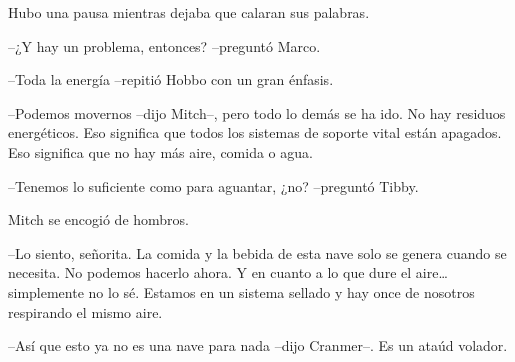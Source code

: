 {Hubo una pausa mientras dejaba que calaran sus palabras.}

{--¿Y hay un problema, entonces? --preguntó Marco.}

{--Toda la energía --repitió Hobbo con un gran énfasis.}

{--Podemos movernos --dijo Mitch--, pero todo lo demás se ha ido. No hay
 residuos energéticos. Eso significa que todos los sistemas de soporte
 vital están apagados. Eso significa que no hay más aire, comida o
agua.}

{--Tenemos lo suficiente como para aguantar, ¿no? --preguntó Tibby.}

{Mitch se encogió de hombros.}

{--Lo siento, señorita. La comida y la bebida de esta nave solo se genera
 cuando se necesita. No podemos hacerlo ahora. Y en cuanto a lo que dure
 el aire\ldots{} simplemente no lo sé. Estamos en un sistema sellado y
hay once de nosotros respirando el mismo aire.}

{--Así que esto ya no es una nave para nada --dijo Cranmer--. Es un ataúd
volador.}
